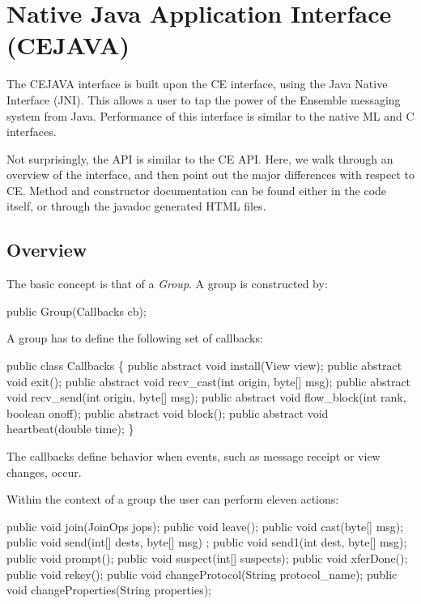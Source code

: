 %
%
%
\section{Native Java Application Interface (CEJAVA)}

The CEJAVA interface is built upon the CE interface, using the Java
Native Interface (JNI). This allows a user to tap the power of the
Ensemble messaging system from Java. Performance of this interface is
similar to the native ML and C interfaces. 

Not surprisingly, the API is similar to the CE API. Here, we walk
through an overview of the interface, and then point out the major
differences with respect to CE. Method and constructor documentation
can be found either in the code itself, or through the javadoc
generated HTML files.

\subsection{Overview}
The basic concept is that of a {\it Group}. A group is constructed by: 
\begin{codebox}
    public Group(Callbacks cb);
\end{codebox}

A group has to define the following set of callbacks: 

\begin{codebox}
public class Callbacks \{
    public abstract void install(View view);
    public abstract void exit();
    public abstract void recv_cast(int origin, byte[] msg);
    public abstract void recv_send(int origin, byte[] msg);
    public abstract void flow_block(int rank, boolean onoff);
    public abstract void block();
    public abstract void heartbeat(double time);
\}
\end{codebox}

The callbacks define behavior when events, such as message receipt or
view changes, occur. 

Within the context of a group the user can perform eleven actions: 

\begin{codebox}
    public void join(JoinOps jops);
    public void leave();
    public void cast(byte[] msg);
    public void send(int[] dests, byte[] msg) ;
    public void send1(int dest, byte[] msg);
    public void prompt();
    public void suspect(int[] suspects);
    public void xferDone();
    public void rekey();
    public void changeProtocol(String protocol_name);
    public void changeProperties(String properties);
\end{codebox}

